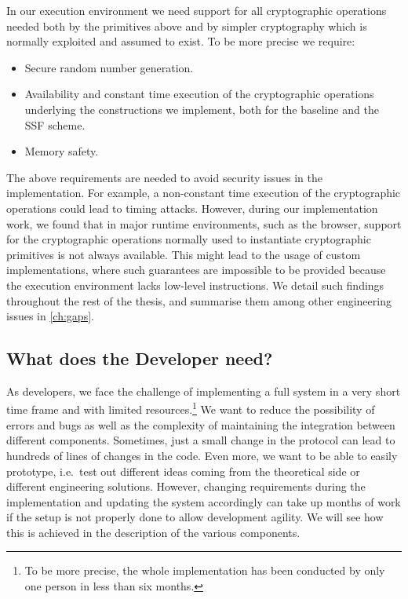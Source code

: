 In our execution environment 
we need support for all cryptographic operations
needed both by the primitives above and by simpler
cryptography which is normally exploited and assumed to exist. 
To be more precise we require:
\begin{itemize}
    \item Secure random number generation.
    \item Availability and constant time execution of the cryptographic operations underlying the constructions we implement, both for the baseline and the SSF scheme.
    \item Memory safety.
\end{itemize}
The above requirements are needed to avoid security
issues in the implementation. For example, a non-constant
time execution of the cryptographic operations could
lead to timing attacks. 
However, during our implementation work, 
we found that in major runtime
environments, such as the browser, 
support for the cryptographic operations normally
used to instantiate cryptographic primitives is not always available.
This might lead to the usage of custom implementations,
where such guarantees are impossible to be provided because
the execution environment lacks low-level instructions.
We detail such findings throughout the rest of the thesis,
and summarise them among other engineering issues in \cref{ch:gaps}.

\subsection{What does the Developer need?}\label{sc:developer}

As developers, we face the challenge of implementing a full
system in a very short time frame and with limited resources.\footnote{To be more precise, the whole implementation has been conducted by only one person in less than six months.}
We want to reduce the possibility of errors and bugs
as well as the complexity of maintaining the integration between
different components.
Sometimes, just a small change in the protocol can lead to
hundreds of lines of changes in the code.
Even more, we want to be able to easily prototype, i.e.\ test
out different ideas coming from the theoretical side
or different engineering solutions.
However, changing requirements during the implementation
and updating the system accordingly can take up months of work
if the setup is not properly done to allow development agility.
We will see how this is achieved in the description of the various components.


